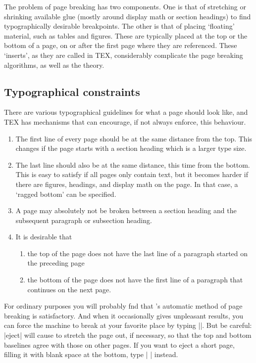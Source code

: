 The problem of page breaking has two components. One is that of stretching or shrinking
available glue (mostly around display math or section headings) to find typographically
desirable breakpoints. The other is that of placing ‘floating’ material, such as tables and
figures. These are typically placed at the top or the bottom of a page, on or after the first
page where they are referenced. These ‘inserts’, as they are called in TEX, considerably
complicate the page breaking algorithms, as well as the theory.

\subsection{Typographical constraints}

There are various typographical guidelines for what a page should look like, and TEX has
mechanisms that can encourage, if not always enforce, this behaviour.

\begin{enumerate}[1.]
\item The first line of every page should be at the same distance from the top. This changes
if the page starts with a section heading which is a larger type size.

\item The last line should also be at the same distance, this time from the bottom. This
is easy to satisfy if all pages only contain text, but it becomes harder if there are
figures, headings, and display math on the page. In that case, a ‘ragged bottom’ can
be specified.

\item  A page may absolutely not be broken between a section heading and the subsequent
paragraph or subsection heading.

\item It is desirable that

\begin{enumerate}[1.]
\item the top of the page does not have the last line of a paragraph started on the
preceding page

\item the bottom of the page does not have the first line of a paragraph that continues
on the next page.
\end{enumerate}

\end{enumerate}



For ordinary purposes you will probably fnd that \tex's automatic
method of page breaking is satisfactory. And when it occasionally gives unpleasant
results, you can force the machine to break at your favorite place by
typing |\eject|. But be careful: |eject| will cause \tex to stretch the page
out, if necessary, so that the top and bottom baselines agree with those on other
pages.  If you want to eject a short page, filling it with blank space at the bottom,
type | \vfill\eject|  instead.

